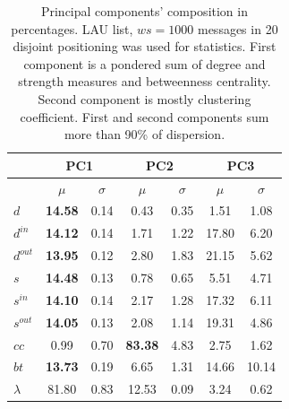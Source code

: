 \documentclass[%
 aip,
 jmp,%
 amsmath,amssymb,
 reprint,%
]{revtex4-1}
\begin{document}
\begin{table}
  \centering
  \begin{tabular}{|l|c|c| c|c| c|c|}\hline
 & \multicolumn{2}{c|}{PC1} & \multicolumn{2}{c|}{PC2} & \multicolumn{2}{c|}{PC3}  \\\hline
       & $\mu$ & $\sigma$ & $\mu$ & $\sigma$ & $\mu$ & $\sigma$  \\\hline
$d$       & {\bf 14.58} & 0.14 & 0.43  & 0.35 & 1.51  & 1.08 \\
$d^{in}$  & {\bf 14.12} & 0.14 & 1.71  & 1.22 & 17.80 & 6.20 \\
$d^{out}$ & {\bf 13.95} & 0.12 & 2.80  & 1.83 & 21.15 & 5.62 \\
$s$       & {\bf 14.48} & 0.13 & 0.78  & 0.65 & 5.51  & 4.71 \\ 
$s^{in}$  & {\bf 14.10} & 0.14 & 2.17  & 1.28 & 17.32 & 6.11 \\ 
$s^{out}$ & {\bf 14.05} & 0.13 & 2.08  & 1.14 & 19.31 & 4.86 \\ \hline
$cc$      & 0.99        & 0.70 & {\bf 83.38} & 4.83 & 2.75  & 1.62 \\ 
$bt$      & {\bf 13.73} & 0.19 & 6.65  & 1.31 & 14.66 & 10.14 \\ \hline
$\lambda$ & 81.80 & 0.83 & 12.53 & 0.09  & 3.24 & 0.62 \\ \hline
  \end{tabular}
  \caption{Principal components' composition in percentages. LAU list, $ws=1000$ messages in 20 disjoint positioning was used for statistics. First component is a pondered sum of degree and strength measures and betweenness centrality. Second component is mostly clustering coefficient. First and second components sum more than 90\% of dispersion.}
  \label{compPCA}
\end{table}
\end{document}
